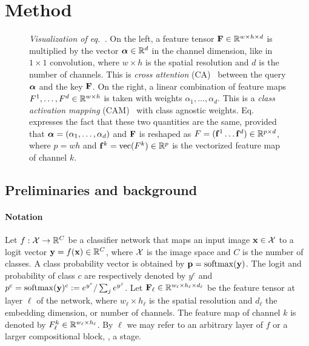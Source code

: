 \section{Method}

\begin{figure*}[t]
\centering
\vspace{3pt}
\caption{\emph{Visualization of eq.~.} On the left, a feature tensor $\mathbf{F} \in \mathbb{R}^{w \times h \times d}$ is multiplied by the vector ${\boldsymbol{\alpha}} \in \mathbb{R}^d$ in the channel dimension, like in $1 \times 1$ convolution, where $w \times h$ is the spatial resolution and $d$ is the number of channels. This is \emph{cross attention} (CA)~\cite{dosovitskiy2020image} between the query ${\boldsymbol{\alpha}}$ and the key $\mathbf{F}$. On the right, a linear combination of feature maps $F^1, \dots, F^d \in \mathbb{R}^{w \times h}$ is taken with weights $\alpha_1, \dots, \alpha_d$. This is a \emph{class activation mapping} (CAM)~\cite{zhou2016learning} with class agnostic weights. Eq.~ expresses the fact that these two quantities are the same, provided that ${\boldsymbol{\alpha}} = (\alpha_1, \dots, \alpha_d)$ and $\mathbf{F}$ is reshaped as $F = (\mathbf{f}^1 \dots \mathbf{f}^d) \in \mathbb{R}^{p \times d}$, where $p = wh$ and $\mathbf{f}^k = \operatorname{vec}(F^k) \in \mathbb{R}^{p}$ is the vectorized feature map of channel $k$.}
\label{fig:connection}
\end{figure*}

\subsection{Preliminaries and background}
\label{subsec:prelim}

\paragraph{Notation}

Let $f: \mathcal{X} \rightarrow \mathbb{R}^C$ be a classifier network that maps an input image $\mathbf{x} \in \mathcal{X}$ to a logit vector $\mathbf{y}= f(\mathbf{x}) \in \mathbb{R}^C$, where $\mathcal{X}$ is the image space and $C$ is the number of classes. A class probability vector is obtained by $\mathbf{p} = \operatorname{softmax}(\mathbf{y})$. The logit and probability of class $c$ are respectively denoted by $y^c$ and $p^c = \operatorname{softmax}(\mathbf{y})^c \mathrel{:=} e^{y^c} / \sum_j e^{y^j}$. Let $\mathbf{F}_\ell \in \mathbb{R}^{w_\ell \times h_\ell \times d_\ell}$ be the feature tensor at layer $\ell$ of the network, where $w_\ell \times h_\ell$ is the spatial resolution and $d_\ell$ the embedding dimension, or number of channels. The feature map of channel $k$ is denoted by $F^k_\ell \in \mathbb{R}^{w_\ell \times h_\ell}$. By $\ell$ we may refer to an arbitrary layer of $f$ or a larger compositional block, \eg, a stage.

